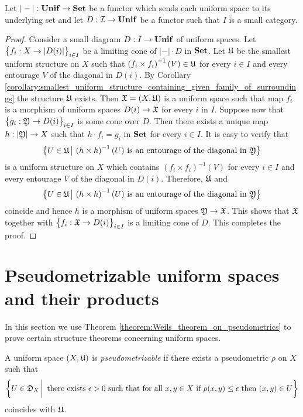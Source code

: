 \begin{theorem}\label{theorem:creation_of_limits_for_forgetful_functor}
Let $|-|:\mathbf{Unif} \rightarrow \mathbf{Set}$ be a functor which sends each uniform space to its underlying set and let $D:{\mathcal I}\rightarrow \mathbf{Unif}$ be a functor such that $I$ is a small category. 
\end{theorem}
\begin{proof}
Consider a small diagram $D:I \rightarrow \mathbf{Unif}$ of uniform spaces. Let $\big\{f_i:X \rightarrow |D(i)|\big\}_{i\in I}$ be a limiting cone of $|-|\cdot D$ in $\mathbf{Set}$. Let ${\mathfrak U}$ be the smallest uniform structure on $X$ such that $\left(f_i\times f_i\right)^{-1}(V)\in {\mathfrak U}$ for every $i\in I$ and every entourage $V$ of the diagonal in $D(i)$. By Corollary \ref{corollary:smallest_uniform_structure_containing_given_family_of_surroundings} the structure
${\mathfrak U}$ exists. Then ${\mathfrak X} = \left(X,{\mathfrak U}\right)$ is a uniform space such that map $f_i$ is a morphism of uniform spaces $D(i)\rightarrow {\mathfrak X}$ for every $i$ in $I$. Suppose now that $\big\{g_i:{\mathfrak Y}\rightarrow D(i)\big\}_{i\in I}$ is some cone over $D$. Then there exists a unique map $h:|{\mathfrak Y}| \rightarrow X$ such that $h\cdot f_i = g_i$ in $\mathbf{Set}$ for every $i\in I$. It is easy to verify that
$$\big\{U\in {\mathfrak U}\,\big|\,\left(h\times h\right)^{-1}(U)\mbox{ is an entourage of the diagonal in }{\mathfrak Y}\big\}$$
is a uniform structure on $X$ which contains $\left(f_i\times f_i\right)^{-1}(V)$ for every $i\in I$ and every entourage $V$ of the diagonal in $D(i)$. Therefore, ${\mathfrak U}$ and
$$\big\{U\in {\mathfrak U}\,\big|\,\left(h\times h\right)^{-1}(U)\mbox{ is an entourage of the diagonal in }{\mathfrak Y}\big\}$$
coincide and hence $h$ is a morphism of uniform spaces ${\mathfrak Y}\rightarrow {\mathfrak X}$. This shows that ${\mathfrak X}$ together with $\big\{f_i:{\mathfrak X} \rightarrow D(i)\big\}_{i\in I}$ is a limiting cone of $D$. This completes the proof.
\end{proof}

\section{Pseudometrizable uniform spaces and their products}
\noindent
In this section we use Theorem \ref{theorem:Weils_theorem_on_pseudometrics} to prove certain structure theorems concerning uniform spaces.

\begin{definition}
A uniform space $(X,{\mathfrak U})$ is \textit{pseudometrizable} if there exists a pseudometric $\rho$ on $X$ such that 
$$\bigg\{U \in {\mathfrak D}_{X}\,\bigg|\,\mbox{ there exists }\epsilon>0\mbox{ such that for all }x,y\in X\mbox{ if }\rho(x,y)\leq \epsilon\mbox{ then }(x,y)\in U\bigg\}$$
coincides with ${\mathfrak U}$.
\end{definition}

